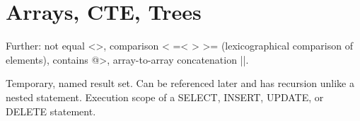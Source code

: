 
\section{Arrays, CTE, Trees}

\begin{breakbox}

\end{breakbox}

\begin{breakbox}
\end{breakbox}

\begin{breakbox}
\end{breakbox}

\begin{breakbox}
\end{breakbox}

\begin{breakbox}
\end{breakbox}

\begin{breakbox}

Further: not equal <>, comparison < =< > >= (lexicographical comparison of elements), contains @>, array-to-array concatenation ||.
\end{breakbox}

\begin{breakbox}

Temporary, named result set. Can be referenced later and has recursion unlike a nested statement. Execution scope of a SELECT, INSERT, UPDATE, or DELETE statement.


\end{breakbox}

